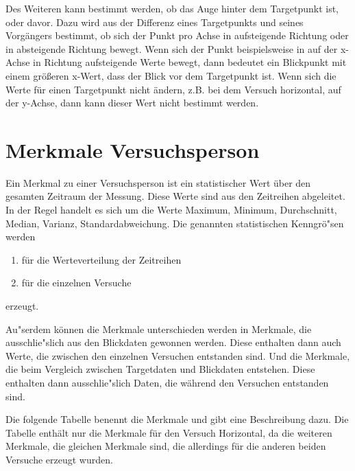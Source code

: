 Des Weiteren kann bestimmt werden, ob das Auge hinter dem Targetpunkt ist, oder davor. Dazu wird aus der Differenz eines Targetpunkts und seines Vorg\"angers bestimmt, ob sich der Punkt pro Achse in aufsteigende Richtung oder in absteigende Richtung bewegt. Wenn sich der Punkt beispielsweise in auf der x-Achse in Richtung aufsteigende Werte bewegt, dann bedeutet ein Blickpunkt mit einem gr\"o\ss{}eren x-Wert, dass der Blick vor dem Targetpunkt ist.
Wenn sich die Werte f\"ur einen Targetpunkt nicht \"andern, z.B. bei dem Versuch horizontal, auf der y-Achse, dann kann dieser Wert nicht bestimmt werden.

\section{Merkmale Versuchsperson}

Ein Merkmal zu einer Versuchsperson ist ein statistischer Wert \"uber den gesamten Zeitraum der Messung. Diese Werte sind aus den Zeitreihen abgeleitet. In der Regel handelt es sich um die Werte Maximum, Minimum, Durchschnitt, Median, Varianz, Standardabweichung.
Die genannten statistischen Kenngr\"o"sen werden
\begin{enumerate}
	\item f\"ur die Werteverteilung der Zeitreihen
	\item f\"ur die einzelnen Versuche
\end{enumerate}
erzeugt.

Au"serdem k\"onnen die Merkmale unterschieden werden in Merkmale, die ausschlie"slich aus den Blickdaten gewonnen werden. Diese enthalten dann auch Werte, die zwischen den einzelnen Versuchen entstanden sind. Und die Merkmale, die beim Vergleich zwischen Targetdaten und Blickdaten entstehen. Diese enthalten dann ausschlie"slich Daten, die w\"ahrend den Versuchen entstanden sind.

Die folgende Tabelle benennt die Merkmale und gibt eine Beschreibung dazu. Die Tabelle enth\"alt nur die Merkmale f\"ur den Versuch Horizontal, da die weiteren Merkmale, die gleichen Merkmale sind, die allerdings f\"ur die anderen beiden Versuche erzeugt wurden.